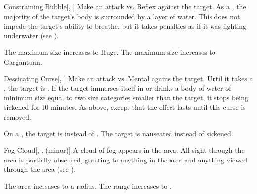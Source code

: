 \lowercase{\hypertarget{spell:Constraining Bubble}{}}\label{spell:Constraining Bubble}
\begin{freeability}[Rank 3]{\hypertarget{spell:Constraining Bubble}{Constraining Bubble}}[, ]
Make an attack vs. Reflex against the target.
\hit As a , the majority of the target's body is surrounded by a layer of water.
This does not impede the target's ability to breathe, but it takes penalties as if it was fighting underwater (see ).

\rankline
{} The maximum size increases to Huge.
 The maximum size increases to Gargantuan.

\end{freeability}
\vspace{0.25em}



\lowercase{\hypertarget{spell:Dessicating Curse}{}}\label{spell:Dessicating Curse}
\begin{freeability}[Rank 3]{\hypertarget{spell:Dessicating Curse}{Dessicating Curse}}[, ]
Make an attack vs. Mental agains the target.
\hit Until it takes a , the target is .
If the target immerses itself in or drinks a body of water of minimum size equal to two size categories smaller than the target,
it stops being sickened for 10 minutes.
\crit As above, except that the effect lasts until this curse is removed.

\rankline
{} On a , the target is  instead of .
 The target is nauseated instead of sickened.

\end{freeability}
\vspace{0.25em}



\lowercase{\hypertarget{spell:Fog Cloud}{}}\label{spell:Fog Cloud}
\begin{freeability}[Rank 3]{\hypertarget{spell:Fog Cloud}{Fog Cloud}}[, ,  (minor)]
A cloud of fog appears in the area.
All sight through the area is partially obscured, granting  to anything in the area and anything viewed through the area (see ).

\rankline
{} The area increases to a \arealarge radius.
 The range increases to \rnglong.

\end{freeability}
\vspace{0.25em}



